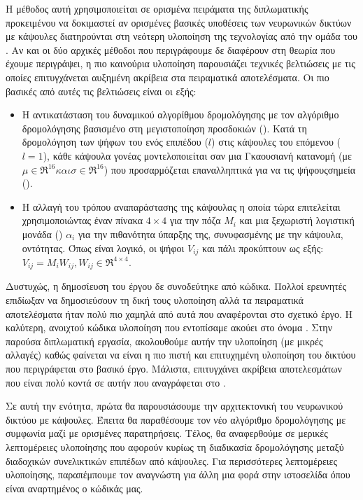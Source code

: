 Η μέθοδος αυτή χρησιμοποιείται σε ορισμένα πειράματα της διπλωματικής προκειμένου να δοκιμαστεί αν ορισμένες βασικές υποθέσεις των νευρωνικών δικτύων με κάψουλες διατηρούνται στη νεότερη υλοποίηση της τεχνολογίας από την ομάδα του . Αν και οι δύο αρχικές μέθοδοι που περιγράφουμε δε διαφέρουν στη θεωρία που έχουμε περιγράψει, η πιο καινούρια υλοποίηση παρουσιάζει τεχνικές βελτιώσεις με τις οποίες επιτυγχάνεται αυξημένη ακρίβεια στα πειραματικά αποτελέσματα. Οι πιο βασικές από αυτές τις βελτιώσεις είναι οι εξής:
\begin{itemize}
  \item Η αντικατάσταση του δυναμικού αλγορίθμου δρομολόγησης με τον αλγόριθμο δρομολόγησης βασισμένο στη μεγιστοποίηση προσδοκιών (). Κατά τη δρομολόγηση των ψήφων του ενός επιπέδου ($l$) στις κάψουλες του επόμενου ($l=1$), κάθε κάψουλα γονέας μοντελοποιείται σαν μια Γκαουσιανή κατανομή (με $\mu \in \Re^{16} και \sigma \in \Re^{16}$) που προσαρμόζεται επαναλληπτικά για να  τις ψήφους\textendash σημεία ().
  \item Η αλλαγή του τρόπου αναπαράστασης της κάψουλας η οποία τώρα επιτελείται χρησιμοποιώντας έναν πίνακα $4\times 4$ για την πόζα $M_i$ και μια ξεχωριστή λογιστική μονάδα () $\alpha_i$ για την πιθανότητα ύπαρξης της, συνυφασμένης με την κάψουλα, οντότητας. Όπως είναι λογικό, οι ψήφοι $V_{ij}$ και πάλι προκύπτουν ως εξής: $V_{ij} = M_iW_{ij}, W_{ij} \in \Re^{4\times 4}$.
\end{itemize}

Δυστυχώς, η δημοσίευση του έργου \cite{hinton2018matrix} δε συνοδεύτηκε από κώδικα. Πολλοί ερευνητές επιδίωξαν να δημοσιεύσουν τη δική τους υλοποίηση αλλά τα πειραματικά αποτελέσματα ήταν πολύ πιο χαμηλά από αυτά που αναφέρονται στο σχετικό έργο. Η καλύτερη, ανοιχτού κώδικα υλοποίηση που εντοπίσαμε ακούει στο όνομα  \cite{gritzman2019avoiding}. Στην παρούσα διπλωματική εργασία, ακολουθούμε αυτήν την υλοποίηση (με μικρές αλλαγές) καθώς φαίνεται να είναι η πιο πιστή και επιτυχημένη υλοποίηση του δικτύου που περιγράφεται στο βασικό έργο. Μάλιστα, επιτυγχάνει ακρίβεια αποτελεσμάτων που είναι πολύ κοντά σε αυτήν που αναγράφεται στο \cite{hinton2018matrix}.\par

Σε αυτή την ενότητα, πρώτα θα παρουσιάσουμε την αρχιτεκτονική του νευρωνικού δικτύου με κάψουλες. Έπειτα θα παραθέσουμε τον νέο αλγόριθμο δρομολόγησης με συμφωνία μαζί με ορισμένες παρατηρήσεις. Τέλος, θα αναφερθούμε σε μερικές λεπτομέρειες υλοποίησης που αφορούν κυρίως τη διαδικασία δρομολόγησης μεταξύ διαδοχικών συνελικτικών επιπέδων από κάψουλες. Για περισσότερες λεπτομέρειες υλοποίησης, παραπέμπουμε τον αναγνώστη για άλλη μια φορά στην ιστοσελίδα όπου είναι αναρτημένος ο κώδικάς μας.

